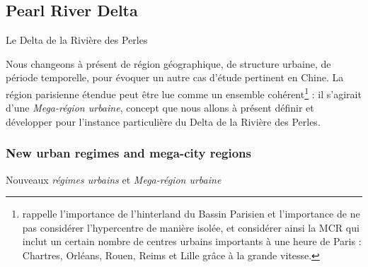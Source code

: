 \subsection{Pearl River Delta}{Le Delta de la Rivière des Perles}

Nous changeons à présent de région géographique, de structure urbaine, de période temporelle, pour évoquer un autre cas d'étude pertinent en Chine. La région parisienne étendue peut être lue comme un ensemble cohérent\footnote{\cite{gilli2005bassin} rappelle l'importance de l'hinterland du Bassin Parisien et l'importance de ne pas considérer l'hypercentre de manière isolée, et considérer ainsi la MCR qui inclut un certain nombre de centres urbains importants à une heure de Paris : Chartres, Orléans, Rouen, Reims et Lille grâce à la grande vitesse.} : il s'agirait d'une \emph{Mega-région urbaine}, concept que nous allons à présent définir et développer pour l'instance particulière du Delta de la Rivière des Perles.


\subsubsection{New urban regimes and mega-city regions}{Nouveaux \emph{régimes urbains} et \emph{Mega-région urbaine}}



